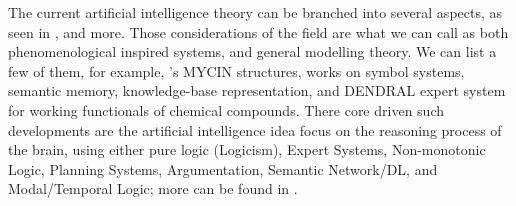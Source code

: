 The current artificial intelligence theory can be branched into several aspects, as seen in \cite{Jackson2019,GoertzelPennachin2006,Chowdhary2020,10.5555/1671238}, and more. Those considerations of the field are what we can call as both phenomenological inspired systems, and general modelling theory. We can list a few of them, for example, \cite{shortliffe1976computer}'s MYCIN structures, \cite{newell1976computer} works on symbol systems, \cite{collins1969retrieval} semantic memory, \cite{davis1977production} knowledge-base representation, and \cite{Lindsay1993DENDRALAC} DENDRAL expert system for working functionals of chemical compounds. There core driven such developments are the artificial intelligence idea focus on the reasoning process of the brain, using either pure logic (Logicism), Expert Systems, Non-monotonic Logic, Planning Systems, Argumentation, Semantic Network/DL, and Modal/Temporal Logic; more can be found in \cite{math13111707}. 

